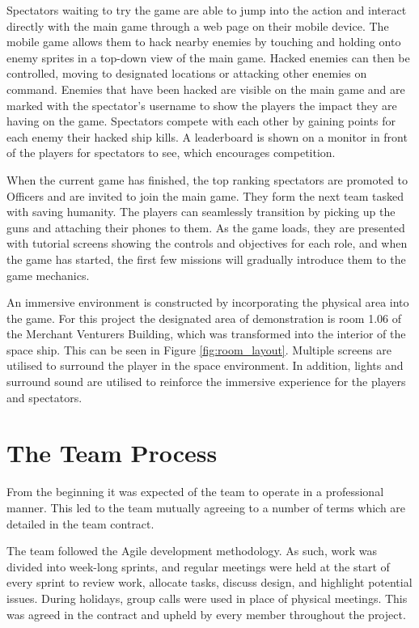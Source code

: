 \documentclass[a4paper,11pt]{article}
\begin{document}
Spectators waiting to try the game are able to jump into the action and interact directly with the main game through a web page on their mobile device. The mobile game allows them to hack nearby enemies by touching and holding onto enemy sprites in a top-down view of the main game. Hacked enemies can then be controlled, moving to designated locations or attacking other enemies on command. Enemies that have been hacked are visible on the main game and are marked with the spectator’s username to show the players the impact they are having on the game. Spectators compete with each other by gaining points for each enemy their hacked ship kills. A leaderboard is shown on a monitor in front of the players for spectators to see, which encourages competition. 

When the current game has finished, the top ranking spectators are promoted to Officers and are invited to join the main game. They form the next team tasked with saving humanity. The players can seamlessly transition by picking up the guns and attaching their phones to them. As the game loads, they are presented with tutorial screens showing the controls and objectives for each role, and when the game has started, the first few missions will gradually introduce them to the game mechanics.

An immersive environment is constructed by incorporating the physical area into the game. For this project the designated area of demonstration is room 1.06 of the  Merchant Venturers Building, which was transformed into the interior of the space ship. This can be seen in Figure \ref{fig:room_layout}. Multiple screens are utilised to surround the player in the space environment. In addition, lights and surround sound are utilised to reinforce the immersive experience for the players and spectators. 

\section{The Team Process}

From the beginning it was expected of the team to operate in a professional manner. This led to the team mutually agreeing to a number of terms which are detailed in the team contract.

The team followed the Agile development methodology. As such, work was divided into week-long sprints, and regular meetings were held at the start of every sprint to review work, allocate tasks, discuss design, and highlight potential issues. During holidays, group calls were used in place of physical meetings. This was agreed in the contract and upheld by every member throughout the project.
\end{document}

